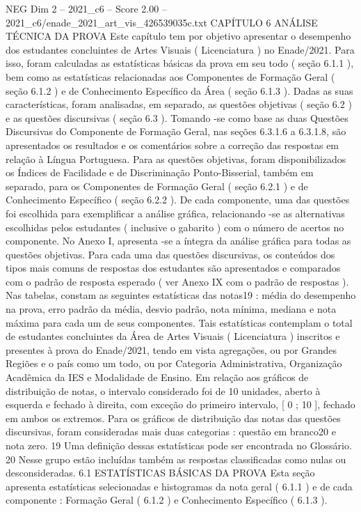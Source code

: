 \begin{textsample}{NEG Dim 2 – 2021\_c6 – Score 2.00 – 2021\_c6/enade\_2021\_art\_vis\_426539035c.txt}  \label{ex:f2_neg_258}
CAPÍTULO 6 ANÁLISE TÉCNICA DA PROVA Este capítulo tem por objetivo apresentar o desempenho dos estudantes concluintes de Artes Visuais ( Licenciatura ) no Enade/2021.
Para isso, foram calculadas as estatísticas básicas da prova em seu todo ( seção 6.1.1 ), bem como as estatísticas relacionadas aos Componentes de Formação Geral ( seção 6.1.2 ) e de Conhecimento Específico da Área ( seção 6.1.3 ).
Dadas as suas características, foram analisadas, em separado, as questões objetivas ( seção 6.2 ) e as questões discursivas ( seção 6.3 ).
Tomando -se como base as duas Questões Discursivas do Componente de Formação Geral, nas seções 6.3.1.6 a 6.3.1.8, são apresentados os resultados e os comentários sobre a correção das respostas em relação à Língua Portuguesa.
Para as questões objetivas, foram disponibilizados os Índices de Facilidade e de Discriminação Ponto-Bisserial, também em separado, para os Componentes de Formação Geral ( seção 6.2.1 ) e de Conhecimento Específico ( seção 6.2.2 ).
De cada componente, uma das questões foi escolhida para exemplificar a análise gráfica, relacionando -se as alternativas escolhidas pelos estudantes ( inclusive o gabarito ) com o número de acertos no componente.
No Anexo I, apresenta -se a íntegra da análise gráfica para todas as questões objetivas.
Para cada uma das questões discursivas, os conteúdos dos tipos mais comuns de respostas dos estudantes são apresentados e comparados com o padrão de resposta esperado ( ver Anexo IX com o padrão de respostas ).
Nas tabelas, constam as seguintes estatísticas das notas19 : média do desempenho na prova, erro padrão da média, desvio padrão, nota mínima, mediana e nota máxima para cada um de seus componentes.
Tais estatísticas contemplam o total de estudantes concluintes da Área de Artes Visuais ( Licenciatura ) inscritos e presentes à prova do Enade/2021, tendo em vista agregações, ou por Grandes Regiões e o país como um todo, ou por Categoria Administrativa, Organização Acadêmica da IES e Modalidade de Ensino.
Em relação aos gráficos de distribuição de notas, o intervalo considerado foi de 10 unidades, aberto à esquerda e fechado à direita, com exceção do primeiro intervalo, [ 0 ; 10 ], fechado em ambos os extremos.
Para os gráficos de distribuição das notas das questões discursivas, foram consideradas mais duas categorias : questão em branco20 e nota zero. 19 Uma definição dessas estatísticas pode ser encontrada no Glossário. 20 Nesse grupo estão incluídas também as respostas classificadas como nulas ou desconsideradas. 6.1 ESTATÍSTICAS BÁSICAS DA PROVA Esta seção apresenta estatísticas selecionadas e histogramas da nota geral ( 6.1.1 ) e de cada componente : Formação Geral ( 6.1.2 ) e Conhecimento Específico ( 6.1.3 ).

\end{textsample}
